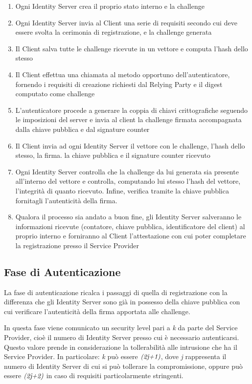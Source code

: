 \begin{enumerate}
	\item Ogni Identity Server crea il proprio stato interno e la challenge
	\item Ogni Identity Server invia al Client una serie di requisiti secondo cui deve essere svolta la cerimonia di registrazione, e la challenge generata
	\item Il Client salva tutte le challenge ricevute in un vettore e computa l'hash dello stesso
	\item Il Client effettua una chiamata al metodo opportuno dell'autenticatore, fornendo i requisiti di creazione richiesti dal Relying Party e il digest computato come challenge
	\item L'autenticatore procede a generare la coppia di chiavi crittografiche seguendo le imposizioni del server e invia al client la challenge firmata accompagnata dalla chiave pubblica e dal signature counter
	\item Il Client invia ad ogni Identity Server il vettore con le challenge, l'hash dello stesso, la firma. la chiave pubblica e il signature counter ricevuto
	\item Ogni Identity Server controlla che la challenge da lui generata sia presente all'interno del vettore e controlla, computando lui stesso l'hash del vettore, l'integrità di quanto ricevuto. Infine, verifica tramite la chiave pubblica fornitagli l'autenticità della firma.
	\item Qualora il processo sia andato a buon fine, gli Identity Server salveranno le informazioni ricevute (contatore, chiave pubblica, identificatore del client) al proprio interno e forniranno al Client l'attestazione con cui poter completare la registrazione presso il Service Provider
\end{enumerate} 

\subsection{Fase di Autenticazione}
\label{autenticazione}

La fase di autenticazione ricalca i passaggi di quella di registrazione con la differenza che gli Identity Server sono già in possesso della chiave pubblica con cui verificare l'autenticità della firma apportata alle challenge. 

In questa fase viene comunicato un security level pari a \emph{k} da parte del Service Provider, cioè il numero di Identity Server presso cui è necessario autenticarsi. Questo valore prende in considerazione la tollerabilità alle intrusione che ha il Service Provider. In particolare: \emph{k} può essere $ \emph{(2j+1)} $, dove \emph{j} rappresenta il numero di Identity Server di cui si può tollerare la compromissione, oppure può essere $ \emph{(2j+2)} $ in caso di requisiti particolarmente stringenti. 


